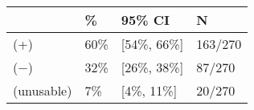 \begin{tabular}{llll}
\hline
& \% & 95\% CI  & N \\
\hline
(+) & 60\% & [54\%, 66\%] & 163/270\\
($-$) & 32\% & [26\%, 38\%] & 87/270\\
(unusable) & 7\% & [4\%, 11\%] & 20/270\\
\hline
\end{tabular}
